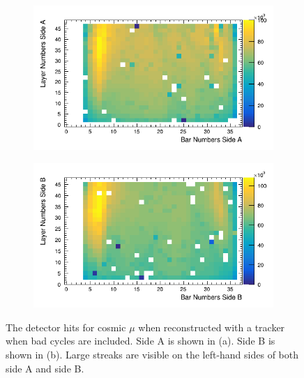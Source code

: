 \begin{figure}[!h]
\centering
\begin{subfigure}{.5\textwidth}
  \centering
  \includegraphics[width=\linewidth]{Chapter5/Figs/Raster/sideAHitsWithBadCycles.png}
  \captionsetup{width=.9\linewidth}
  \caption{} 
  \label{subFig:sideAHitsWithBadCycles}
\end{subfigure}%
\begin{subfigure}{.5\textwidth}
  \centering
\includegraphics[width=\linewidth]{Chapter5/Figs/Raster/sideBHitsWithBadCycles.png}
  \captionsetup{width=.9\linewidth}
  \caption{}
  \label{subFig:sideBHitsWithBadCycles}
\end{subfigure}
\caption{The detector hits for cosmic $\mu$ when reconstructed with a tracker when bad cycles are included. Side A is shown in (a). Side B is shown in (b). Large streaks are visible on the left-hand sides of both side A and side B.}
\label{fig:sideABHitsWithBadCycles}
\end{figure}

